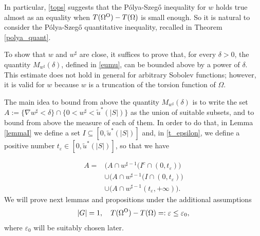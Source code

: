 \documentclass[oneside,a4paper,11pt,notitlepage]{article}
\newcommand{\abs}[1]{{\left|#1\right|}}
\theoremstyle{definition}
\theoremstyle{plain}
\theoremstyle{definition}
\newcommand{\OO}{\text{\normalfont  O}}
\begin{document}
In particular, \eqref{tops} suggests that the P\'olya-Szeg\H o inequality for $w$ holds true almost as an equality when $T(\Omega^\OO) - T(\Omega)$ is small enough. So it is natural to consider the P\'olya-Szeg\H o quantitative inequality, recalled in Theorem \ref{polya_quant}.


To show that $w$ and $w^\sharp$ are close, it suffices to prove that, for every $\delta>0$, the quantity $M_{w^\sharp}(\delta)$, defined in \eqref{eumu}, can be bounded above by a power of $\delta$. This estimate does not hold in general for arbitrary Sobolev functions; however, it is valid for $w$ because $w$ is a truncation of the torsion function of $\Omega$.

The main idea to bound from above the quantity $M_{w^{\sharp}}(\delta)$ is to write the set $A:=\{\nabla w^\sharp < \delta\} \cap \{0 <w^\sharp < {\tilde u}^\ast(\abs{S})\}$ as the union of suitable subsets, and to bound from above the measure of each of them. In order to do that, in Lemma \ref{lemmaI}
 we define a set $I\subseteq [0,{\tilde u}^\ast(\abs{S})]$ and, in \eqref{t_epsilon}, we define a positive number $t_{\varepsilon}\in{[0, {\tilde u}^\ast(\abs{S})]}$, so that we have

\begin{align*}
   A=&\Big( A\cap w^{\sharp-1}(I^c\cap (0,t_{\varepsilon})\Big)\\
    &\cup\Big(A\cap w^{\sharp-1}(I\cap (0,t_{\varepsilon})\Big)\\
    &\cup\Big(A\cap w^{\sharp-1}(t_{\varepsilon}, +\infty)\Big).
\end{align*}
We will prove next lemmas and propositions under the additional assumptions
$$ \abs{G}=1, \quad T(\Omega^\OO) - T(\Omega)=:\varepsilon \le \varepsilon_0, $$ where $\varepsilon_0$ will be suitably chosen later.
\end{document}
